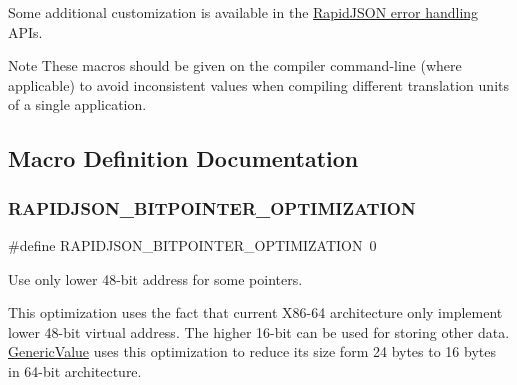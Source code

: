 Some additional customization is available in the \hyperlink{group__RAPIDJSON__ERRORS}{Rapid\+J\+S\+ON error handling} A\+P\+Is.

\begin{DoxyNote}{Note}
These macros should be given on the compiler command-\/line (where applicable) to avoid inconsistent values when compiling different translation units of a single application. 
\end{DoxyNote}


\subsection{Macro Definition Documentation}
\mbox{\label{group__RAPIDJSON__CONFIG_ga93fb983f78208d12c822376e1ea6d185}} 
\subsubsection{\texorpdfstring{R\+A\+P\+I\+D\+J\+S\+O\+N\+\_\+B\+I\+T\+P\+O\+I\+N\+T\+E\+R\+\_\+\+O\+P\+T\+I\+M\+I\+Z\+A\+T\+I\+ON}{RAPIDJSON\_48BITPOINTER\_OPTIMIZATION}}
{\footnotesize\ttfamily \#define R\+A\+P\+I\+D\+J\+S\+O\+N\+\_\+B\+I\+T\+P\+O\+I\+N\+T\+E\+R\+\_\+\+O\+P\+T\+I\+M\+I\+Z\+A\+T\+I\+ON~0}



Use only lower 48-\/bit address for some pointers. 

This optimization uses the fact that current X86-\/64 architecture only implement lower 48-\/bit virtual address. The higher 16-\/bit can be used for storing other data. {\ttfamily \hyperlink{classGenericValue}{Generic\+Value}} uses this optimization to reduce its size form 24 bytes to 16 bytes in 64-\/bit architecture. \mbox{\label{group__RAPIDJSON__CONFIG_ga583915242504c7fdb36e826f02f76242}} 
